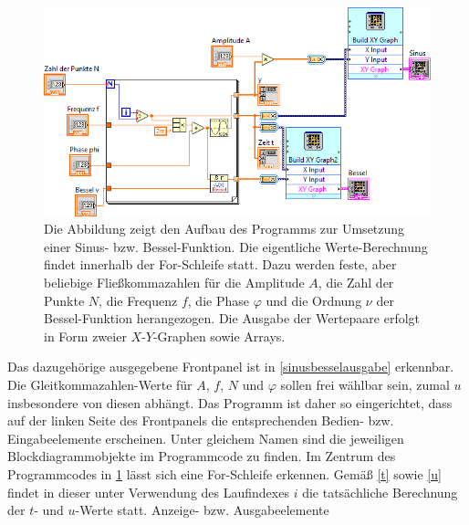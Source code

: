 \documentclass[
a4paper,
12pt,
pagesize,
ngerman
]{scrartcl}
\begin{document}
	\begin{figure}[h]
		\centering
		\includegraphics[width=1.0\textwidth]{EIRE2018Dateien/Tag1/sinusbessel-bilder/SinusBesseld}
		\caption{Die Abbildung zeigt den Aufbau des Programms zur Umsetzung einer Sinus- bzw. Bessel-Funktion. Die eigentliche Werte-Berechnung findet innerhalb der For-Schleife statt. Dazu werden feste, aber beliebige Fließkommazahlen für die Amplitude $A$, die Zahl der Punkte $N$, die Frequenz $f$, die Phase $\varphi$ und die Ordnung $\nu$ der Bessel-Funktion herangezogen. Die Ausgabe der Wertepaare erfolgt in Form zweier $X$-$Y$-Graphen sowie Arrays.}
		\label{sinusbesselprogrammcode}
		\centering
	\end{figure}

	\noindent Das dazugehörige ausgegebene Frontpanel ist in \cref{sinusbesselausgabe} erkennbar. Die Gleitkommazahlen-Werte für $A$, $f$, $N$ und $\varphi$ sollen frei wählbar sein, zumal $u$ insbesondere von diesen abhängt. Das Programm ist daher so eingerichtet, dass auf der linken Seite des Frontpanels die entsprechenden Bedien- bzw. Eingabeelemente erscheinen. Unter gleichem Namen sind die jeweiligen Blockdiagrammobjekte im Programmcode zu finden. Im Zentrum des Programmcodes in \cref{sinusbesselprogrammcode} lässt sich eine For-Schleife erkennen. Gemäß \cref{t} sowie \cref{u} findet in dieser unter Verwendung des Laufindexes $i$ die tatsächliche Berechnung der $t$- und $u$-Werte statt.            Anzeige- bzw. Ausgabeelemente
\end{document}
